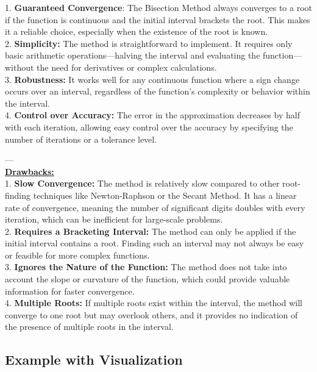 \documentclass[12pt,a4paper]{article}
\begin{document}
	1. \textbf{Guaranteed Convergence}: The Bisection Method always converges to a root if the function is continuous and the initial interval brackets the root. This makes it a reliable choice, especially when the existence of the root is known.\\
	
	2. \textbf{Simplicity:} The method is straightforward to implement. It requires only basic arithmetic operations—halving the interval and evaluating the function—without the need for derivatives or complex calculations.\\
	
	3. \textbf{Robustness:} It works well for any continuous function where a sign change occurs over an interval, regardless of the function's complexity or behavior within the interval.\\
	
	4. \textbf{Control over Accuracy:} The error in the approximation decreases by half with each iteration, allowing easy control over the accuracy by specifying the number of iterations or a tolerance level.
	
	---\\
	
	\textbf{ \underline{Drawbacks:} }\\
	
	1. \textbf{Slow Convergence:} The method is relatively slow compared to other root-finding techniques like Newton-Raphson or the Secant Method. It has a linear rate of convergence, meaning the number of significant digits doubles with every iteration, which can be inefficient for large-scale problems.\\
	
	2. \textbf{Requires a Bracketing Interval:} The method can only be applied if the initial interval contains a root. Finding such an interval may not always be easy or feasible for more complex functions.\\
	
	3. \textbf{Ignores the Nature of the Function:} The method does not take into account the slope or curvature of the function, which could provide valuable information for faster convergence.\\
	
	4. \textbf{Multiple Roots:} If multiple roots exist within the interval, the method will converge to one root but may overlook others, and it provides no indication of the presence of multiple roots in the interval.
	
	\subsection{Example with Visualization} 
	
\end{document}
